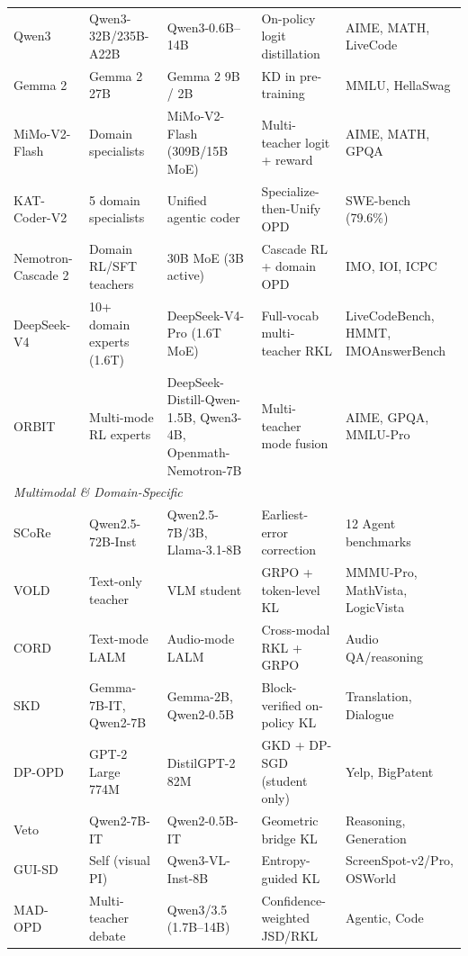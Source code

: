 \documentclass{article} %
\begin{document}
\begin{table}[t]
{\begin{tabular}{@{}lllll@{}}
        Qwen3~\citep{2505.09388} & Qwen3-32B/235B-A22B & Qwen3-0.6B--14B & On-policy logit distillation & AIME, MATH, LiveCode \\
        Gemma 2~\citep{2408.00118} & Gemma 2 27B & Gemma 2 9B / 2B & KD in pre-training & MMLU, HellaSwag \\
        MiMo-V2-Flash~\citep{2601.02780} & Domain specialists & MiMo-V2-Flash (309B/15B MoE) & Multi-teacher logit + reward & AIME, MATH, GPQA \\
        KAT-Coder-V2~\citep{2603.27703} & 5 domain specialists & Unified agentic coder & Specialize-then-Unify OPD & SWE-bench (79.6\%) \\
        Nemotron-Cascade 2~\citep{2603.19220} & Domain RL/SFT teachers & 30B MoE (3B active) & Cascade RL + domain OPD & IMO, IOI, ICPC \\
        DeepSeek-V4~\citep{deepseekv4} & 10+ domain experts (1.6T) & DeepSeek-V4-Pro (1.6T MoE) & Full-vocab multi-teacher RKL & LiveCodeBench, HMMT, IMOAnswerBench \\
        ORBIT~\citep{2601.08310} & Multi-mode RL experts & DeepSeek-Distill-Qwen-1.5B, Qwen3-4B, Openmath-Nemotron-7B & Multi-teacher mode fusion & AIME, GPQA, MMLU-Pro \\
        \midrule
        \multicolumn{5}{l}{\textit{Multimodal \& Domain-Specific}} \\
        \midrule
        SCoRe~\citep{2509.14257} & Qwen2.5-72B-Inst & Qwen2.5-7B/3B, Llama-3.1-8B & Earliest-error correction & 12 Agent benchmarks \\
        VOLD~\citep{2510.23497} & Text-only teacher & VLM student & GRPO + token-level KL & MMMU-Pro, MathVista, LogicVista \\
        CORD~\citep{2601.16547} & Text-mode LALM & Audio-mode LALM & Cross-modal RKL + GRPO & Audio QA/reasoning \\
        SKD~\citep{2410.11325} & Gemma-7B-IT, Qwen2-7B & Gemma-2B, Qwen2-0.5B & Block-verified on-policy KL & Translation, Dialogue \\
        DP-OPD~\citep{2604.04461} & GPT-2 Large 774M & DistilGPT-2 82M & GKD + DP-SGD (student only) & Yelp, BigPatent \\
        Veto~\citep{2601.07155} & Qwen2-7B-IT & Qwen2-0.5B-IT & Geometric bridge KL & Reasoning, Generation \\
        GUI-SD~\citep{2605.00642} & Self (visual PI) & Qwen3-VL-Inst-8B & Entropy-guided KL & ScreenSpot-v2/Pro, OSWorld \\
        MAD-OPD~\citep{2605.01347} & Multi-teacher debate & Qwen3/3.5 (1.7B--14B) & Confidence-weighted JSD/RKL & Agentic, Code \\

\end{tabular}}
\end{table}
\end{document}

